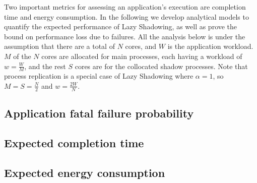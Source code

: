 Two important metrics for assessing an application's execution are completion time and energy consumption. In the following we develop analytical models to quantify the expected performance of Lazy Shadowing, as well as prove the bound on performance loss due to failures. %
All the analysis below is under the assumption that there are a total of $N$ cores, and $W$ is the application workload.  
$M$ of the $N$ cores are allocated for main processes, each having a workload of $w=\frac{W}{M}$, and the rest $S$ cores are for the collocated shadow processes. %
Note that process replication is a special case of Lazy Shadowing where $\alpha=1$, so 
$M=S=\frac{N}{2}$ and $w=\frac{2W}{N}$. 


\subsection{Application fatal failure probability}
\label{anal_app_fail}


\subsection{Expected completion time}
\label{anal_time}


\subsection{Expected energy consumption}
\label{anal_energy}

